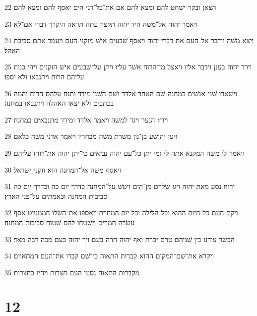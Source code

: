 \par 22 הצאן ובקר ישׁחט להם ומצא להם אם את־כל־דגי הים יאסף להם ומצא להם׃
\par 23 ויאמר יהוה אל־משׁה היד יהוה תקצר עתה תראה היקרך דברי אם־לא׃
\par 24 ויצא משׁה וידבר אל־העם את דברי יהוה ויאסף שׁבעים אישׁ מזקני העם ויעמד אתם סביבת האהל׃
\par 25 וירד יהוה בענן וידבר אליו ויאצל מן־הרוח אשׁר עליו ויתן על־שׁבעים אישׁ הזקנים ויהי כנוח עליהם הרוח ויתנבאו ולא יספו׃
\par 26 וישׁארו שׁני־אנשׁים במחנה שׁם האחד אלדד ושׁם השׁני מידד ותנח עלהם הרוח והמה בכתבים ולא יצאו האהלה ויתנבאו במחנה׃
\par 27 וירץ הנער ויגד למשׁה ויאמר אלדד ומידד מתנבאים במחנה׃
\par 28 ויען יהושׁע בן־נון משׁרת משׁה מבחריו ויאמר אדני משׁה כלאם׃
\par 29 ויאמר לו משׁה המקנא אתה לי ומי יתן כל־עם יהוה נביאים כי־יתן יהוה את־רוחו עליהם׃
\par 30 ויאסף משׁה אל־המחנה הוא וזקני ישׂראל׃
\par 31 ורוח נסע מאת יהוה ויגז שׂלוים מן־הים ויטשׁ על־המחנה כדרך יום כה וכדרך יום כה סביבות המחנה וכאמתים על־פני הארץ׃
\par 32 ויקם העם כל־היום ההוא וכל־הלילה וכל יום המחרת ויאספו את־השׂלו הממעיט אסף עשׂרה חמרים וישׁטחו להם שׁטוח סביבות המחנה׃
\par 33 הבשׂר עודנו בין שׁניהם טרם יכרת ואף יהוה חרה בעם ויך יהוה בעם מכה רבה מאד׃
\par 34 ויקרא את־שׁם־המקום ההוא קברות התאוה כי־שׁם קברו את־העם המתאוים׃
\par 35 מקברות התאוה נסעו העם חצרות ויהיו בחצרות׃

\chapter{12}

